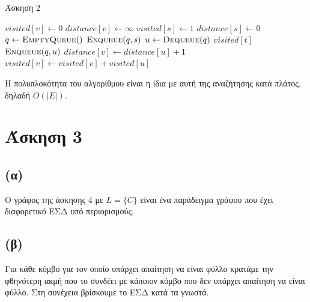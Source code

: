 \documentclass[11pt,a4paper,oneside]{report}
\begin{document}
\begin{algorithm}[H]	
\caption{\textgreek{Άσκηση 2}}
\begin{algorithmic}[1]

        \State $visited[ v ] \gets 0$
        \State $distance[ v ] \gets \infty$
    \EndFor
    \State $visited[ s ] \gets 1$
    \State $distance[ s ] \gets 0$
    \State $q \gets \Call{EmptyQueue}$
    \State $\Call{Enqueue}{q, s}$
        \State $u \gets \Call{Dequeue}{q}$
            \State \Return $visited[ t ]$
        \EndIf
                \State $\Call{Enqueue}{q, u}$
            \EndIf
                \State $distance[ v ] \gets distance[ u ] + 1$
                \State $visited[ v ] \gets visited[ v ] + visited[ u ]$
            \EndIf
        \EndFor
    \EndWhile
\EndProcedure
\end{algorithmic}
\end{algorithm}

Η πολυπλοκότητα του αλγορίθμου είναι η ίδια με αυτή της αναζήτησης κατά πλάτος, δηλαδή $O( |E| )$.

\section*{Άσκηση 3}
\subsection*{(α)}
Ο γράφος της άσκησης 4 με $L = \{ C \}$ είναι ένα παράδειγμα γράφου που έχει διαφορετικό ΕΣΔ υπό περιορισμούς.

\subsection*{(β)}
Για κάθε κόμβο για τον οποίο υπάρχει απαίτηση να είναι φύλλο κρατάμε την φθηνότερη ακμή που το συνδέει με κάποιον κόμβο που δεν υπάρχει απαίτηση να είναι φύλλο. Στη συνέχεια βρίσκουμε το ΕΣΔ κατά τα γνωστά.
\end{document}
